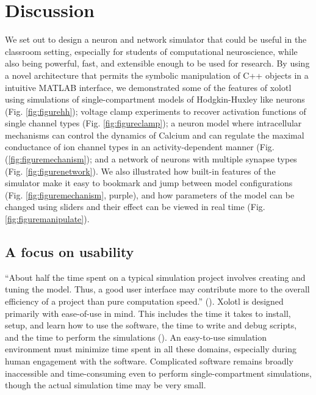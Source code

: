 \documentclass{frontiersSCNS} %
\begin{document}
%
%
%
%
%
%

\section{Discussion}
\label{discussion}

We set out to design a neuron and network simulator that could be useful in the classroom setting, especially for students of computational neuroscience, while also being powerful, fast, and extensible enough to be used for research. By using a novel architecture that permits the symbolic manipulation of C++ objects in a intuitive MATLAB interface, we demonstrated some of the features of xolotl using simulations of single-compartment models of Hodgkin-Huxley like neurons (Fig. \ref{fig:figurehh}); voltage clamp experiments to recover activation functions of single channel types (Fig. \ref{fig:figureclamp}); a neuron model where intracellular mechanisms can control the dynamics of Calcium and can regulate the maximal conductance of ion channel types in an activity-dependent manner (Fig. (\ref{fig:figuremechanism}); and a network of neurons with multiple synapse types (Fig. \ref{fig:figurenetwork}). We also illustrated how built-in features of the simulator make it easy to bookmark and jump between model configurations (Fig. \ref{fig:figuremechanism}, purple), and how parameters of the model can be changed using sliders and their effect can be viewed in real time (Fig. \ref{fig:figuremanipulate}).



\subsection{A focus on usability}

``About half the time spent on a typical simulation project involves creating and tuning the model. Thus, a good user interface may contribute more to the overall efficiency of a project than pure computation speed.'' (\cite{deschutterConsumerGuideNeuronal1992}). Xolotl is designed primarily with ease-of-use in mind. This includes the time it takes to install, setup, and learn how to use the software, the time to write and debug scripts, and the time to perform the simulations (\cite{rudolph2007much}). An easy-to-use simulation environment must minimize time spent in all these domains, especially during human engagement with the software. Complicated software remains broadly inaccessible and time-consuming even to perform single-compartment simulations, though the actual simulation time may be very small.
\end{document}
